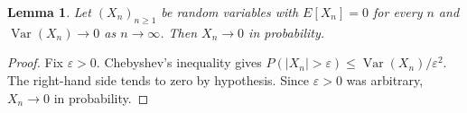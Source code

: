 \documentclass{article}
\newtheorem{lemma}{Lemma}
\begin{document}
\begin{lemma}\label{lem:chebyshev}
Let $(X_n)_{n \ge 1}$ be random variables with $E[X_n] = 0$ for every $n$
and $\operatorname{Var}(X_n) \to 0$ as $n \to \infty$.
Then $X_n \to 0$ in probability.
\end{lemma}

\begin{proof}
Fix $\varepsilon > 0$.
Chebyshev's inequality gives
$P(|X_n| > \varepsilon) \le \operatorname{Var}(X_n) / \varepsilon^2$.
The right-hand side tends to zero by hypothesis.
Since $\varepsilon > 0$ was arbitrary, $X_n \to 0$ in probability.
\end{proof}
\end{document}
